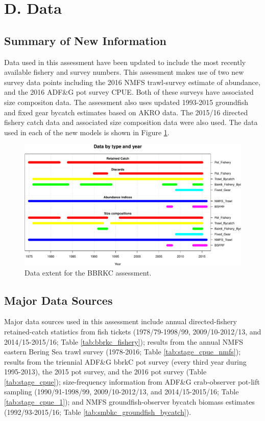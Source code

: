 \documentclass[]{article}
\begin{document}
\section{D. Data}\label{d.-data}

\subsection{Summary of New
Information}\label{summary-of-new-information}

Data used in this assessment have been updated to include the most
recently available fishery and survey numbers. This assessment makes use
of two new survey data points including the 2016 NMFS trawl-survey
estimate of abundance, and the 2016 ADF\&G pot survey CPUE. Both of
these surveys have associated size compositon data. The assessment also
uses updated 1993-2015 groundfish and fixed gear bycatch estimates based
on AKRO data. The 2015/16 directed fishery catch data and associated
size composition data were also used. The data used in each of the new
models is shown in Figure \ref{fig:data_extent}.

\begin{figure}[htbp]
\centering
\includegraphics{bbrkc_files/figure-latex/data_extent-1.pdf}
\caption{Data extent for the BBRKC assessment.\label{fig:data_extent}}
\end{figure}

\subsection{Major Data Sources}\label{major-data-sources}

Major data sources used in this assessment include annual
directed-fishery retained-catch statistics from fish tickets
(1978/79-1998/99, 2009/10-2012/13, and 2014/15-2015/16; Table
\ref{tab:bbrkc_fishery}); results from the annual NMFS eastern Bering
Sea trawl survey (1978-2016; Table \ref{tab:stage_cpue_nmfs}); results
from the triennial ADF\&G bbrkC pot survey (every third year during
1995-2013), the 2015 pot survey, and the 2016 pot survey (Table
\ref{tab:stage_cpue}); size-frequency information from ADF\&G
crab-observer pot-lift sampling (1990/91-1998/99, 2009/10-2012/13, and
2014/15-2015/16; Table \ref{tab:stage_cpue_1}); and NMFS
groundfish-observer bycatch biomass estimates (1992/93-2015/16; Table
\ref{tab:smbkc_groundfish_bycatch}).
\end{document}
